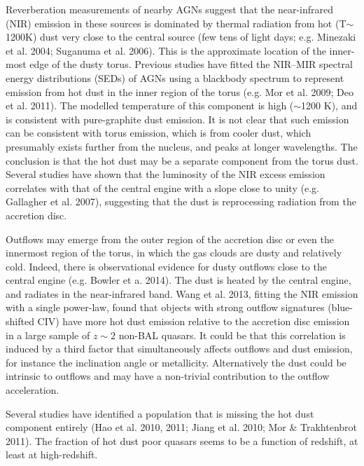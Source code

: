 Reverberation measurements of nearby AGNs suggest that the near-infrared (NIR) emission in these sources is dominated by thermal radiation from hot (T$\sim$1200K) dust very close to the central source (few tens of light days; e.g. Minezaki et al. 2004; Suganuma et al. 2006). 
This is the approximate location of the inner-most edge of the dusty torus. 
Previous studies have fitted the NIR–MIR spectral energy distributions (SEDs) of AGNs using a blackbody spectrum to represent emission from hot dust in the inner region of the torus (e.g. Mor et al. 2009; Deo et al. 2011). 
The modelled temperature of this component is high ($\sim$1200 K), and is consistent with pure-graphite dust emission.  
It is not clear that such emission can be consistent with torus emission, which is from cooler dust, which presumably exists further from the nucleus, and peaks at longer wavelengths.  
The conclusion is that the hot dust may be a separate component from the torus dust. 
Several studies have shown that the luminosity of the NIR excess emission correlates with that of the central engine with a slope close to unity (e.g. Gallagher et al. 2007), suggesting that the dust is reprocessing radiation from the accretion disc. 

Outflows may emerge from the outer region of the accretion disc or even the innermost region of the torus, in which the gas clouds are dusty and relatively cold.  
Indeed, there is observational evidence for dusty outflows close to the central engine (e.g. Bowler et a. 2014). The dust is heated by the central engine, and radiates in the near-infrared band. 
Wang et al. 2013, fitting the NIR emission with a single power-law, found that objects with strong outflow signatures (blue-shifted CIV) have more hot dust emission relative to the accretion disc emission in a large sample of $z \sim 2$ non-BAL quasars. 
It could be that this correlation is induced by a third factor that simultaneously affects outflows and dust emission, for instance the inclination angle or metallicity. 
Alternatively the dust could be intrinsic to outflows and may have a non-trivial contribution to the outflow acceleration.

Several studies have identified a population that is missing the hot dust component entirely (Hao et al. 2010, 2011; Jiang et al. 2010; Mor \& Trakhtenbrot 2011). 
The fraction of hot dust poor quasars seems to be a function of redshift, at least at high-redshift. 

